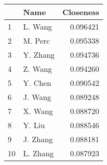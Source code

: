 \begin{tabular}{llr}
\toprule
{} &      Name &  Closeness \\
\midrule
1  &   L. Wang &   0.096421 \\
2  &   M. Perc &   0.095338 \\
3  &  Y. Zhang &   0.094736 \\
4  &   Z. Wang &   0.094260 \\
5  &   Y. Chen &   0.090542 \\
6  &   J. Wang &   0.089248 \\
7  &   X. Wang &   0.088720 \\
8  &    Y. Liu &   0.088546 \\
9  &  J. Zhang &   0.088181 \\
10 &  L. Zhang &   0.087923 \\
\bottomrule
\end{tabular}
